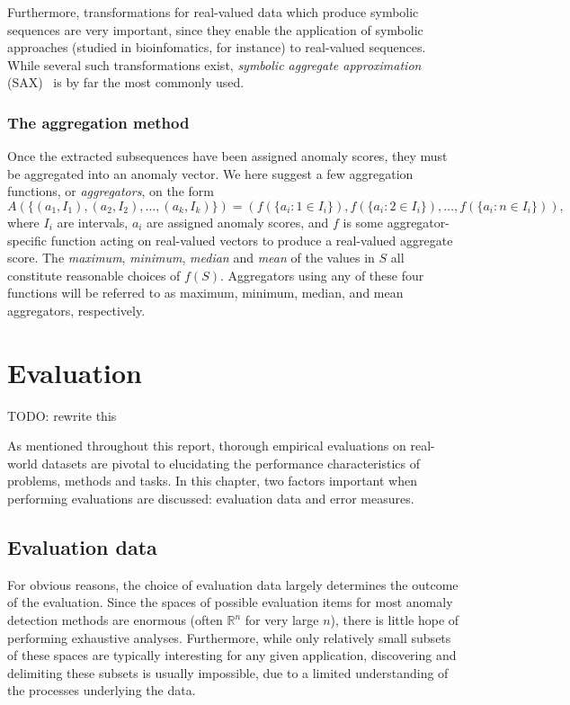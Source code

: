 Furthermore, transformations for real-valued data which produce symbolic sequences are very important, since they enable the application of symbolic approaches (studied in bioinfomatics, for instance) to real-valued sequences. While several such transformations exist, \emph{symbolic aggregate approximation} (SAX)~\cite{sax} is by far the most commonly used.

\subsubsection{The aggregation method}
\label{sect:aggregation_method}

Once the extracted subsequences have been assigned anomaly scores, they must be aggregated into an anomaly vector. We here suggest a few aggregation functions, or \emph{aggregators}, on the form
\[
    A(\{(a_1, I_1), (a_2, I_2), \dots, (a_k, I_k) \}) = (f(\{a_i: 1 \in I_i\}), f(\{a_i: 2 \in I_i\}), \dots, f(\{a_i: n \in I_i\})),
\]
where $I_i$ are intervals, $a_i$ are assigned anomaly scores, and $f$ is some aggregator-specific function acting on real-valued vectors to produce a real-valued aggregate score. The \emph{maximum}, \emph{minimum}, \emph{median} and \emph{mean} of the values in $S$ all constitute reasonable choices of $f(S)$. Aggregators using any of these four functions will be referred to as maximum, minimum, median, and mean aggregators, respectively.

\section{Evaluation}
\label{ch:evaluation}

TODO: rewrite this

As mentioned throughout this report, thorough empirical evaluations on real-world datasets are pivotal to elucidating the performance characteristics of problems, methods and tasks. In this chapter, two factors important when performing evaluations are discussed: evaluation data and error measures.

\subsection{Evaluation data}
\label{sect:evaluation_data}

For obvious reasons, the choice of evaluation data largely determines the outcome of the evaluation. Since the spaces of possible evaluation items for most anomaly detection methods are enormous (often $\mathbb{R}^n$ for very large $n$), there is little hope of performing exhaustive analyses. Furthermore, while only relatively small subsets of these spaces are typically interesting for any given application, discovering and delimiting these subsets is usually impossible, due to a limited understanding of the processes underlying the data.

